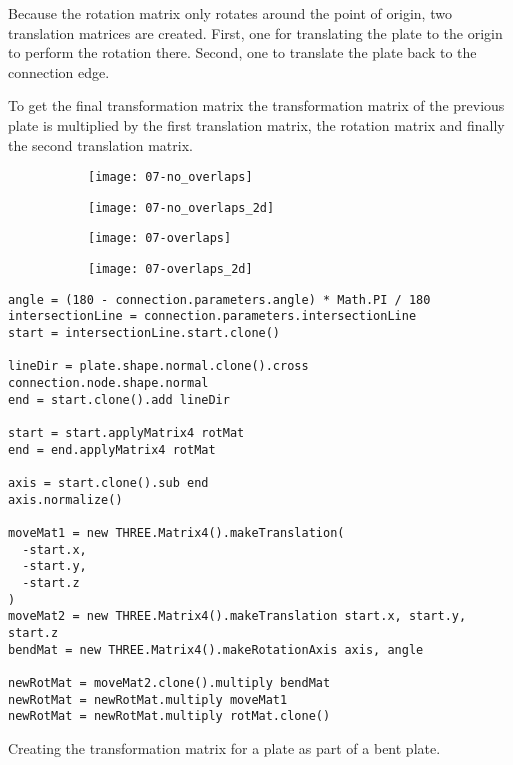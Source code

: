 \documentclass[../ClassicThesis.tex]{subfiles}
\begin{document}
Because the rotation matrix only rotates around the point of origin, two translation matrices are created. First, one for translating the plate to the origin to perform the rotation there. Second, one to translate the plate back to the connection edge.

To get the final transformation matrix the transformation matrix of the previous plate is multiplied by the first translation matrix, the rotation matrix and finally the second translation matrix.

\begin{figure}[h]
  \centering
  \begin{subfigure}[b]{0.49\textwidth}
    \centering
    \texttt{[image: 07-no\_overlaps]}
    \caption{}
    \label{fig:bend-matrix:1}
  \end{subfigure}
  \begin{subfigure}[b]{0.49\textwidth}
    \centering
    \texttt{[image: 07-no\_overlaps\_2d]}
    \caption{}
    \label{fig:bend-matrix:2}
  \end{subfigure}
  \begin{subfigure}[b]{0.49\textwidth}
    \centering
    \texttt{[image: 07-overlaps]}
    \caption{}
    \label{fig:bend-matrix:3}
  \end{subfigure}
  \begin{subfigure}[b]{0.49\textwidth}
    \centering
    \texttt{[image: 07-overlaps\_2d]}
    \caption{}
    \label{fig:bend-matrix:4}
  \end{subfigure}
  \caption{}
  \label{fig:bend-matrix}
\end{figure}

\begin{listing}[ht]
\begin{verbatim}
angle = (180 - connection.parameters.angle) * Math.PI / 180
intersectionLine = connection.parameters.intersectionLine
start = intersectionLine.start.clone()

lineDir = plate.shape.normal.clone().cross connection.node.shape.normal
end = start.clone().add lineDir

start = start.applyMatrix4 rotMat
end = end.applyMatrix4 rotMat

axis = start.clone().sub end
axis.normalize()

moveMat1 = new THREE.Matrix4().makeTranslation(
  -start.x,
  -start.y,
  -start.z
)
moveMat2 = new THREE.Matrix4().makeTranslation start.x, start.y, start.z
bendMat = new THREE.Matrix4().makeRotationAxis axis, angle

newRotMat = moveMat2.clone().multiply bendMat
newRotMat = newRotMat.multiply moveMat1
newRotMat = newRotMat.multiply rotMat.clone()
\end{verbatim}
\caption{Creating the transformation matrix for a plate as part of a bent plate.}
\label{lst:bend-matrix}
\end{listing}
\end{document}
